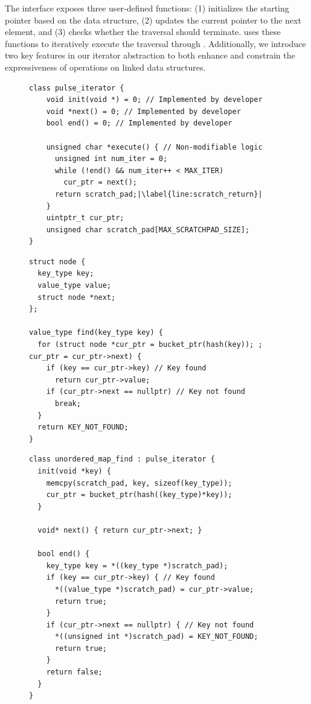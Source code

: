 The interface exposes three user-defined functions: (1)  initializes the starting pointer based on the data structure, (2)  updates the current pointer to the next element, and (3)  checks whether the traversal should terminate. \pulse uses these functions to iteratively execute the traversal through . Additionally, we introduce two key features in our iterator abstraction to both enhance and constrain the expressiveness of operations on linked data structures.


\begin{figure}[th]
\centering
\begin{lstlisting}[caption={\pulse interface.},label={lst:iterator},escapechar=|,basicstyle=\footnotesize,linewidth=\linewidth]
class pulse_iterator {
    void init(void *) = 0; // Implemented by developer
    void *next() = 0; // Implemented by developer
    bool end() = 0; // Implemented by developer
    
    unsigned char *execute() { // Non-modifiable logic
      unsigned int num_iter = 0;
      while (!end() && num_iter++ < MAX_ITER)
        cur_ptr = next();
      return scratch_pad;|\label{line:scratch_return}|
    }
    uintptr_t cur_ptr;
    unsigned char scratch_pad[MAX_SCRATCHPAD_SIZE];
}
\end{lstlisting}
\end{figure}

\begin{figure}[th]
\centering
\begin{lstlisting}[caption={C++ STL realization for \code{unordered\_map::find()}.},label={lst:stl},escapechar=|,basicstyle=\footnotesize,linewidth=\linewidth]
struct node {
  key_type key;
  value_type value;
  struct node *next;
};

value_type find(key_type key) {
  for (struct node *cur_ptr = bucket_ptr(hash(key)); ; cur_ptr = cur_ptr->next) {
    if (key == cur_ptr->key) // Key found
      return cur_ptr->value;
    if (cur_ptr->next == nullptr) // Key not found
      break;
  }
  return KEY_NOT_FOUND;
}
\end{lstlisting}
\begin{lstlisting}[caption={\pulse realization for \code{unordered\_map::find()}.},label={lst:stl_mod},escapechar=|,basicstyle=\footnotesize,linewidth=\linewidth]
class unordered_map_find : pulse_iterator {
  init(void *key) {
    memcpy(scratch_pad, key, sizeof(key_type));
    cur_ptr = bucket_ptr(hash((key_type)*key));
  }
  
  void* next() { return cur_ptr->next; }
  
  bool end() {
    key_type key = *((key_type *)scratch_pad);
    if (key == cur_ptr->key) { // Key found
      *((value_type *)scratch_pad) = cur_ptr->value;
      return true;
    }
    if (cur_ptr->next == nullptr) { // Key not found
      *((unsigned int *)scratch_pad) = KEY_NOT_FOUND;  
      return true;
    }
    return false;
  }
}
\end{lstlisting}
\end{figure}
  
